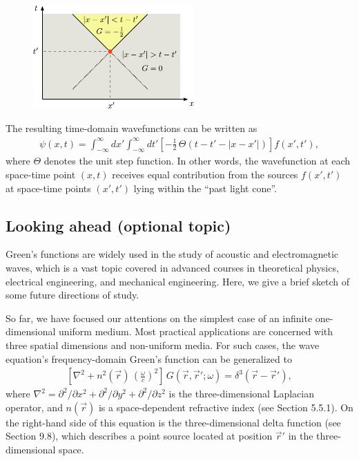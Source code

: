 \documentclass[10pt,a4paper]{article}
\begin{document}
\begin{figure}[ht]
  \centering\includegraphics[width=0.55\textwidth]{spacetime_diagram}
\end{figure}

The resulting time-domain wavefunctions can be written as
\begin{align}
  \psi(x,t) = \int_{-\infty}^\infty dx' \int_{-\infty}^\infty dt' \left[-\frac{1}{2}\,\Theta(t-t' - |x-x'|)\right] f(x',t'),
\end{align}
where $\Theta$ denotes the unit step function.  In other words, the
wavefunction at each space-time point $(x,t)$ receives equal
contribution from the sources $f(x',t')$ at space-time points
$(x',t')$ lying within the ``past light cone''.

\subsection{Looking ahead (optional topic)}\label{looking-ahead}

Green's functions are widely used in the study of acoustic and
electromagnetic waves, which is a vast topic covered in advanced
courses in theoretical physics, electrical engineering, and mechanical
engineering. Here, we give a brief sketch of some future directions of
study.

So far, we have focused our attentions on the simplest case of an
infinite one-dimensional uniform medium. Most practical applications
are concerned with three spatial dimensions and non-uniform media. For
such cases, the wave equation's frequency-domain Green's function can
be generalized to
\begin{align}
  \left[\nabla^2 + n^2(\vec{r}) \, \left(\frac{\omega}{c}\right)^2\right]\, G(\vec{r},\vec{r}';\omega) = \delta^3(\vec{r}-\vec{r}'),
\end{align}
where $\nabla^2 = \partial^2/\partial x^2 + \partial^2/\partial y^2 +
\partial^2/\partial z^2$ is the three-dimensional Laplacian operator,
and $n(\vec{r})$ is a space-dependent refractive index (see Section
5.5.1). On the right-hand side of this equation is the
three-dimensional delta function (see Section 9.8), which describes a
point source located at position $\vec{r}'$ in the three-dimensional
space.
\end{document}
